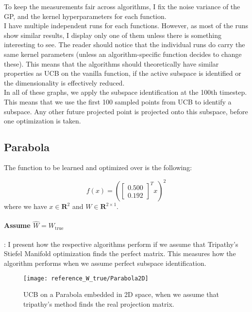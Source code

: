 To keep the measurements fair across algorithms, I fix the noise variance of the GP, and the kernel hyperparameters for each function. \\

I have multiple independent runs for each functions.
However, as most of the runs show similar results, I display only one of them unless there is something interesting to see.
The reader should notice that the individual runs do carry the same kernel parameters (unless an algorithm-specific function decides to change these).
This means that the algorithms should theoretically have similar properties as UCB on the vanilla function, if the active subspace is identified or the dimensionality is effectively reduced. \\

In all of these graphs, we apply the subspace identification at the 100th timestep.
This means that we use the first 100 sampled points from UCB to identify a subspace.
Any other future projected point is projected onto this subspace, before one optimization is taken.


\subsection{Parabola}

The function to be learned and optimized over is the following:

\def\WParaboa2D{
\begin{bmatrix}
    0.500\\
    0.192
\end{bmatrix}}

\begin{equation}
f(x) = \left( \WParaboa2D^T x \right)^2
\end{equation}
where we have $x \in \mathbf{R}^2$ and $W \in \mathbf{R}^{2 \times 1}$.


\paragraph{Assume $\hat{W} = W_{\text{true}}$}: I present how the respective algorithms perform if we assume that Tripathy's Stiefel Manifold optimization finds the perfect matrix.
This measures how the algorithm performs when we assume perfect subspace identification.

\begin{figure}[H]
  \centering
      \texttt{[image: reference\_W\_true/Parabola2D]}
  \caption{UCB on a Parabola embedded in 2D space, when we assume that tripathy's method finds the real projection matrix.}
\end{figure}

